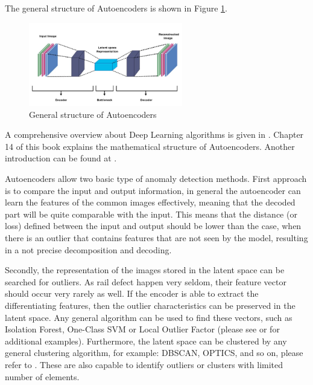 The general structure of Autoencoders is shown in Figure \ref{fig:autoencoder}.

\begin{figure}[H]
    \centering
    \includegraphics[width=0.6\textwidth,trim={0 0 0 1cm},clip]{./tex_images/autoencoder.jpeg}
    \caption{General structure of Autoencoders \cite{khosla_auto_2021}}
    \label{fig:autoencoder}
\end{figure}

A comprehensive overview about Deep Learning algorithms is given in \cite{Goodfellow-et-al-2016}.
Chapter 14 of this book explains the mathematical structure of Autoencoders.
Another introduction can be found at \cite{_autoencoder_2023}.

Autoencoders allow two basic type of anomaly detection methods.
First approach is to compare the input and output information, in general the autoencoder
can learn the features of the common images effectively, meaning that the decoded part will
be quite comparable with the input.
This means that the distance (or loss) defined between the input and output should be lower than
the case, when there is an outlier that contains features that are not seen by the model,
resulting in a not precise decomposition and decoding.

Secondly, the representation of the images stored in the latent space can be searched for outliers.
As rail defect happen very seldom, their feature vector should occur very rarely as well.
If the encoder is able to extract the differentiating features, then the outlier characteristics
can be preserved in the latent space.
Any general algorithm can be used to find these vectors, such as Isolation Forest, One-Class SVM or
Local Outlier Factor (please see \cite{_anomaly_2023} or \cite{sklearn_outlier_detection}
for additional examples).
Furthermore, the latent space can be clustered by any general clustering algorithm, for example:
DBSCAN, OPTICS, and so on, please refer to \cite{sklearn_clustering}.
These are also capable to identify outliers or clusters with limited number of elements.


